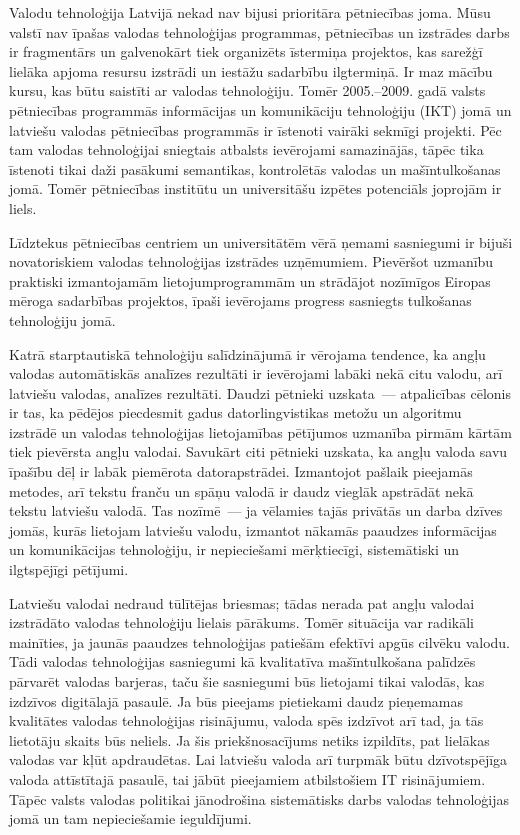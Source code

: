 \begin{multicols}{2}
Valodu tehnoloģija Latvijā nekad nav bijusi prioritāra pētniecības joma.
Mūsu valstī nav īpašas valodas tehnoloģijas programmas, pētniecības un izstrādes darbs ir fragmentārs un galvenokārt tiek organizēts īstermiņa projektos, kas sarežģī lielāka apjoma resursu izstrādi un iestāžu sadarbību ilgtermiņā.
Ir maz mācību kursu, kas būtu saistīti ar valodas tehnoloģiju.
Tomēr 2005.–2009. gadā valsts pētniecības programmās informācijas un komunikāciju tehnoloģiju (IKT) jomā un latviešu valodas pētniecības programmās ir īstenoti vairāki sekmīgi projekti.
Pēc tam valodas tehnoloģijai sniegtais atbalsts ievērojami samazinājās, tāpēc tika īstenoti tikai daži pasākumi semantikas, kontrolētās valodas un mašīntulkošanas jomā.
Tomēr pētniecības institūtu un universitāšu izpētes potenciāls joprojām ir liels. 

Līdztekus pētniecības centriem un universitātēm vērā ņemami sasniegumi ir bijuši novatoriskiem valodas tehnoloģijas izstrādes uzņēmumiem.
Pievēršot uzmanību praktiski izmantojamām lietojumprogrammām un strādājot nozīmīgos Eiropas mēroga sadarbības projektos, īpaši ievērojams progress sasniegts tulkošanas tehnoloģiju jomā.

Katrā starptautiskā tehnoloģiju salīdzinājumā ir vērojama tendence, ka angļu valodas automātiskās analīzes rezultāti ir ievērojami labāki nekā citu valodu, arī latviešu valodas, analīzes rezultāti.
Daudzi pētnieki uzskata~--- atpalicības cēlonis ir tas, ka pēdējos piecdesmit gadus datorlingvistikas metožu un algoritmu izstrādē un valodas tehnoloģijas lietojamības pētījumos uzmanība pirmām kārtām tiek pievērsta angļu valodai.
Savukārt citi pētnieki uzskata, ka angļu valoda savu īpašību dēļ ir labāk piemērota datorapstrādei.
Izmantojot pašlaik pieejamās metodes, arī tekstu franču un spāņu valodā ir daudz vieglāk apstrādāt nekā tekstu latviešu valodā.
Tas nozīmē~--- ja vēlamies tajās privātās un darba dzīves jomās, kurās lietojam latviešu valodu, izmantot nākamās paaudzes informācijas un komunikācijas tehnoloģiju, ir nepieciešami mērķtiecīgi, sistemātiski un ilgtspējīgi pētījumi.

Latviešu valodai nedraud tūlītējas briesmas; tādas nerada pat angļu valodai izstrādāto valodas tehnoloģiju lielais pārākums.
Tomēr situācija var radikāli mainīties, ja jaunās paaudzes tehnoloģijas patiešām efektīvi apgūs cilvēku valodu.
Tādi valodas tehnoloģijas sasniegumi kā kvalitatīva mašīntulkošana palīdzēs pārvarēt valodas barjeras, taču šie sasniegumi būs lietojami tikai valodās, kas izdzīvos digitālajā pasaulē.
Ja būs pieejams pietiekami daudz pieņemamas kvalitātes valodas tehnoloģijas risinājumu, valoda spēs izdzīvot arī tad, ja tās lietotāju skaits būs neliels.
Ja šis priekšnosacījums netiks izpildīts, pat lielākas valodas var kļūt apdraudētas.
Lai latviešu valoda arī turpmāk būtu dzīvotspējīga valoda attīstītajā pasaulē, tai jābūt pieejamiem atbilstošiem IT risinājumiem.
Tāpēc valsts valodas politikai jānodrošina sistemātisks darbs valodas tehnoloģijas jomā un tam nepieciešamie ieguldījumi. 
\end{multicols}

